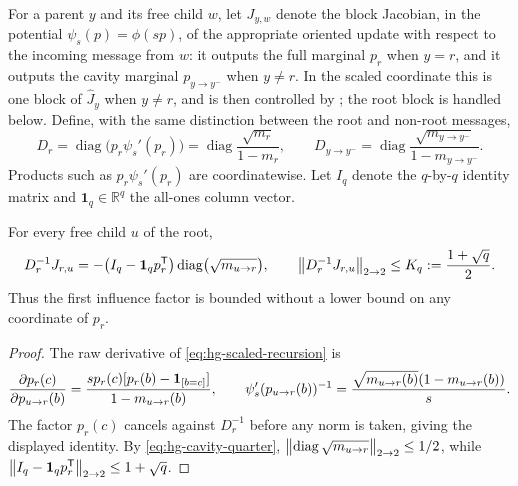 For a parent $y$ and its free child $w$, let $J_{y,w}$ denote the block
Jacobian, in the potential $\psi_s(p)=\phi(sp)$, of the appropriate
oriented update with respect to the incoming message from $w$: it outputs
the full marginal $p_r$ when $y=r$, and it outputs the cavity marginal
$p_{y\to y^-}$ when $y\ne r$.  In the scaled coordinate this is one block
of \(\widehat J_y\) when $y\ne r$, and is then controlled by
; the root block is handled below.  Define,
with the same distinction between the root and non-root messages,
\begin{equation}
  D_r=\operatorname{diag}\bigl(p_r\psi_s'(p_r)\bigr)
     =\operatorname{diag}\frac{\sqrt{m_r}}{1-m_r},
  \qquad
  D_{y\to y^-}
     =\operatorname{diag}\frac{\sqrt{m_{y\to y^-}}}
                                  {1-m_{y\to y^-}} .
  \label{eq:hg-D-matrix}
\end{equation}
Products such as \(p_r\psi_s'(p_r)\) are coordinatewise.
Let \(I_q\) denote the \(q\)-by-\(q\) identity matrix and
\(\mathbf1_q\in\mathbb R^q\) the all-ones column vector.

\begin{lemma}\label{lem:hg-root-response}
For every free child \(u\) of the root,
\begin{equation}
 D_r^{-1}J_{r,u}
 =-\bigl(I_q-\mathbf1_qp_r^{\mathsf T}\bigr)
   \operatorname{diag}\bigl(\sqrt{m_{u\to r}}\bigr),
 \qquad
 \left\|D_r^{-1}J_{r,u}\right\|_{2\to2}
 \le K_q:=\frac{1+\sqrt q}{2}.
 \label{eq:hg-first-jacobian}
\end{equation}
Thus the first influence factor is bounded without a lower bound on any
coordinate of \(p_r\).
\end{lemma}

\begin{proof}
The raw derivative of \eqref{eq:hg-scaled-recursion} is
\[
 \frac{\partial p_r(c)}{\partial p_{u\to r}(b)}
 =\frac{s p_r(c)
        [p_r(b)-\mathbf{1}_{\left[b=c\right]}]}{1-m_{u\to r}(b)},
 \qquad
 \psi_s'(p_{u\to r}(b))^{-1}
 =\frac{\sqrt{m_{u\to r}(b)}
              (1-m_{u\to r}(b))}{s}.
\]
The factor \(p_r(c)\) cancels against \(D_r^{-1}\) before any norm is
taken, giving the displayed identity.  By
\eqref{eq:hg-cavity-quarter},
\(\left\|\operatorname{diag}\sqrt{m_{u\to r}}\right\|_{2\to2}\le1/2\), while
\(\left\|I_q-\mathbf1_qp_r^{\mathsf T}\right\|_{2\to2}\le1+\sqrt q\).
\end{proof}

